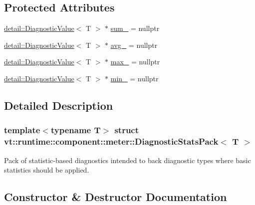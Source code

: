 \subsection*{Protected Attributes}
\begin{DoxyCompactItemize}
\item 
\hyperlink{structvt_1_1runtime_1_1component_1_1detail_1_1_diagnostic_value}{detail\+::\+Diagnostic\+Value}$<$ T $>$ $\ast$ \hyperlink{structvt_1_1runtime_1_1component_1_1meter_1_1_diagnostic_stats_pack_a28c6bb74f1f0ab30e2211c3398942eea}{sum\+\_\+} = nullptr
\item 
\hyperlink{structvt_1_1runtime_1_1component_1_1detail_1_1_diagnostic_value}{detail\+::\+Diagnostic\+Value}$<$ T $>$ $\ast$ \hyperlink{structvt_1_1runtime_1_1component_1_1meter_1_1_diagnostic_stats_pack_aefd1b0e1f4a44808e16361ab61cbf0b7}{avg\+\_\+} = nullptr
\item 
\hyperlink{structvt_1_1runtime_1_1component_1_1detail_1_1_diagnostic_value}{detail\+::\+Diagnostic\+Value}$<$ T $>$ $\ast$ \hyperlink{structvt_1_1runtime_1_1component_1_1meter_1_1_diagnostic_stats_pack_a62c35fa580e2d887ac070c79f10181c3}{max\+\_\+} = nullptr
\item 
\hyperlink{structvt_1_1runtime_1_1component_1_1detail_1_1_diagnostic_value}{detail\+::\+Diagnostic\+Value}$<$ T $>$ $\ast$ \hyperlink{structvt_1_1runtime_1_1component_1_1meter_1_1_diagnostic_stats_pack_a207533d7500f7a6e2714da73c254e6a4}{min\+\_\+} = nullptr
\end{DoxyCompactItemize}


\subsection{Detailed Description}
\subsubsection*{template$<$typename T$>$\newline
struct vt\+::runtime\+::component\+::meter\+::\+Diagnostic\+Stats\+Pack$<$ T $>$}

Pack of statistic-\/based diagnostics intended to back diagnostic types where basic statistics should be applied. 



\subsection{Constructor \& Destructor Documentation}
\mbox{\label{structvt_1_1runtime_1_1component_1_1meter_1_1_diagnostic_stats_pack_a1ff8f169f544a2c1966e9336043f97cb}} 
